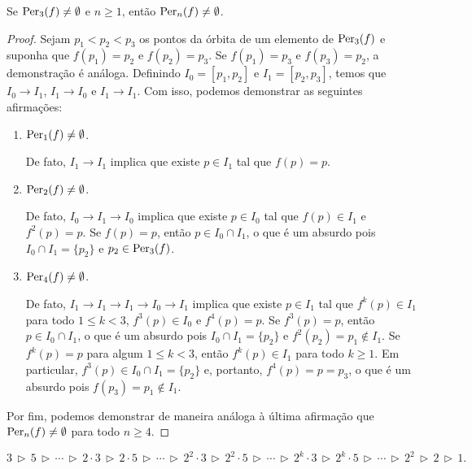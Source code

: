 \begin{theorem}
Se $\operatorname{Per}_3(f) \neq \emptyset$ e $n \geq 1$, então $\operatorname{Per}_n(f) \neq \emptyset$.
\end{theorem}

\begin{proof}
Sejam $p_1 < p_2 < p_3$ os pontos da órbita de um elemento de $\operatorname{Per}_3(f)$ e suponha que $f(p_1) = p_2$ e $f(p_2) = p_3$.
Se $f(p_1) = p_3$ e $f(p_3) = p_2$, a demonstração é análoga.
Definindo $I_0 = [p_1, p_2]$ e $I_1 = [p_2, p_3]$, temos que $I_0 \longrightarrow I_1$, $I_1 \longrightarrow I_0$ e $I_1 \longrightarrow I_1$. Com isso, podemos demonstrar as seguintes afirmações:

\begin{enumerate}[label=\alph*)]
\item $\operatorname{Per}_1(f) \neq \emptyset$.

De fato, $I_1 \longrightarrow I_1$ implica que existe $p \in I_1$ tal que $f(p) = p$.

\item $\operatorname{Per}_2(f) \neq \emptyset$.

De fato, $I_0 \longrightarrow I_1 \longrightarrow I_0$ implica que existe $p \in I_0$ tal que $f(p) \in I_1$ e $f^2(p) = p$.
Se $f(p) = p$, então $p \in I_0 \cap I_1$, o que é um absurdo pois $I_0 \cap I_1 = \lbrace p_2 \rbrace$ e $p_2 \in \operatorname{Per}_3(f)$.

\item $\operatorname{Per}_4(f) \neq \emptyset$.

De fato, $I_1 \longrightarrow I_1 \longrightarrow I_1 \longrightarrow I_0 \longrightarrow I_1$ implica que existe $p \in I_1$ tal que $f^k(p) \in I_1$ para todo $1 \leq k < 3$, $f^3(p) \in I_0$ e $f^4(p) = p$.
Se $f^3(p) = p$, então $p \in I_0 \cap I_1$, o que é um absurdo pois $I_0 \cap I_1 = \lbrace p_2 \rbrace$ e $f^2(p_2) = p_1 \notin I_1$.
Se $f^k(p) = p$ para algum $1 \leq k < 3$, então $f^k(p) \in I_1$ para todo $k \geq 1$.
Em particular, $f^3(p) \in I_0 \cap I_1 = \lbrace p_2 \rbrace$ e, portanto, $f^4(p) = p = p_3$, o que é um absurdo pois $f(p_3) = p_1 \notin I_1$.
\end{enumerate}

Por fim, podemos demonstrar de maneira análoga à última afirmação que $\operatorname{Per}_n(f) \neq \emptyset$ para todo $n \geq 4$.
\end{proof}

\begin{definition}
$$3 \, \triangleright \, 5 
\, \triangleright \, \cdots \, \triangleright \,
2 \cdot 3 \, \triangleright \, 2 \cdot 5 
\, \triangleright \, \cdots \, \triangleright \,
2^2 \cdot 3 \, \triangleright \, 2^2 \cdot 5
\, \triangleright \, \cdots \, \triangleright \,
2^k \cdot 3 \, \triangleright \, 2^k \cdot 5
\, \triangleright \, \cdots \, \triangleright \,
2^2 \, \triangleright \, 2 \, \triangleright \, 1.$$
\end{definition}

